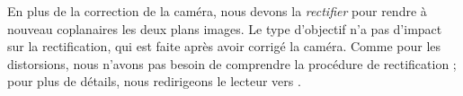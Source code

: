 
En plus de la correction de la caméra, nous devons la \emph{rectifier} pour rendre à nouveau coplanaires les deux plans images. Le type d'objectif n'a pas d'impact sur la rectification, qui est faite après avoir corrigé la caméra. Comme pour les distorsions, nous n'avons pas besoin de comprendre la procédure de rectification ; pour plus de détails, nous redirigeons le lecteur vers \cite[p. 419]{Bradski2008}.